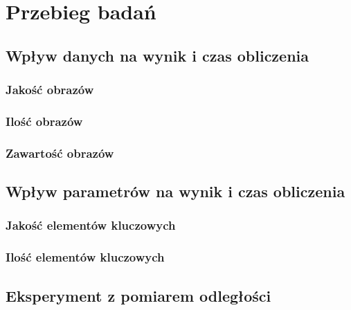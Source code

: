 \chapter{Przebieg badań}
\section{Wpływ danych na wynik i czas obliczenia}
\subsection{Jakość obrazów}
\subsection{Ilość obrazów}
\subsection{Zawartość obrazów}
\section{Wpływ parametrów na wynik i czas obliczenia}
\subsection{Jakość elementów kluczowych}
\subsection{Ilość elementów kluczowych}
\section{Eksperyment z pomiarem odległości}
